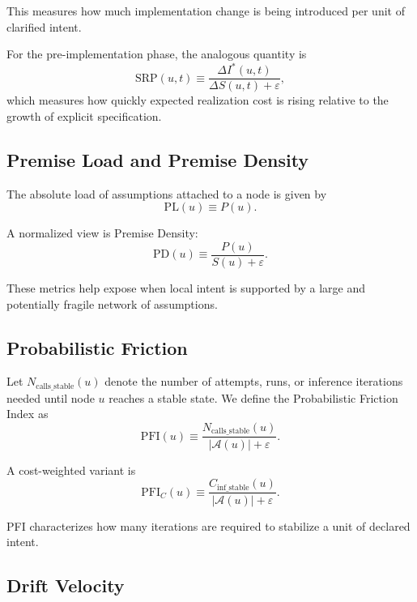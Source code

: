 \documentclass[twocolumn]{aastex701}
\begin{document}
This measures how much implementation change is being introduced
per unit of clarified intent.

For the pre-implementation phase, the analogous quantity is
\begin{equation}
\mathrm{SRP}(u,t) \equiv
\frac{\Delta I^\ast(u,t)}
{\Delta S(u,t)+\varepsilon},
\end{equation}
which measures how quickly expected realization cost is rising
relative to the growth of explicit specification.

\subsection{Premise Load and Premise Density}

The absolute load of assumptions attached to a node is given by
\begin{equation}
\mathrm{PL}(u) \equiv P(u).
\end{equation}

A normalized view is Premise Density:
\begin{equation}
\mathrm{PD}(u) \equiv \frac{P(u)}{S(u)+\varepsilon}.
\end{equation}

These metrics help expose when local intent is supported by
a large and potentially fragile network of assumptions.

\subsection{Probabilistic Friction}

Let $N_{\mathrm{calls\_stable}}(u)$ denote the number of attempts,
runs, or inference iterations needed until node $u$ reaches a stable state.
We define the Probabilistic Friction Index as
\begin{equation}
\mathrm{PFI}(u) \equiv
\frac{N_{\mathrm{calls\_stable}}(u)}
{|\mathcal{A}(u)|+\varepsilon}.
\end{equation}

A cost-weighted variant is
\begin{equation}
\mathrm{PFI}_C(u) \equiv
\frac{C_{\mathrm{inf\_stable}}(u)}
{|\mathcal{A}(u)|+\varepsilon}.
\end{equation}

PFI characterizes how many iterations are required to stabilize
a unit of declared intent.

\subsection{Drift Velocity}
\end{document}
